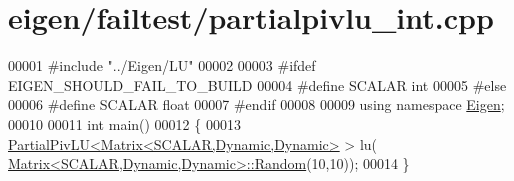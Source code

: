 \hypertarget{eigen_2failtest_2partialpivlu__int_8cpp_source}{}\section{eigen/failtest/partialpivlu\+\_\+int.cpp}
\label{eigen_2failtest_2partialpivlu__int_8cpp_source}

\begin{DoxyCode}
00001 \textcolor{preprocessor}{#include "../Eigen/LU"}
00002 
00003 \textcolor{preprocessor}{#ifdef EIGEN\_SHOULD\_FAIL\_TO\_BUILD}
00004 \textcolor{preprocessor}{#define SCALAR int}
00005 \textcolor{preprocessor}{#else}
00006 \textcolor{preprocessor}{#define SCALAR float}
00007 \textcolor{preprocessor}{#endif}
00008 
00009 \textcolor{keyword}{using namespace }\hyperlink{namespace_eigen}{Eigen};
00010 
00011 \textcolor{keywordtype}{int} main()
00012 \{
00013   \hyperlink{group___l_u___module_class_eigen_1_1_partial_piv_l_u}{PartialPivLU<Matrix<SCALAR,Dynamic,Dynamic>} > lu(
      \hyperlink{group___core___module_class_eigen_1_1_matrix}{Matrix<SCALAR,Dynamic,Dynamic>::Random}(10,10));
00014 \}
\end{DoxyCode}

